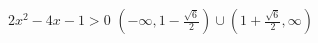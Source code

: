 {$2x^2-4x-1 > 0$}
{ $\left(-\infty, 1-\frac{\sqrt{6}}{2} \right) \cup \left(1+\frac{\sqrt{6}}{2}, \infty \right)$}